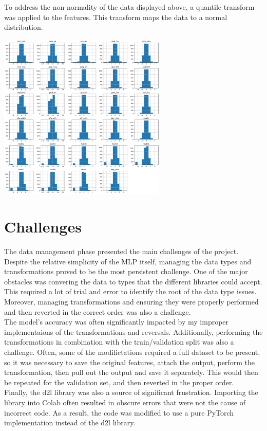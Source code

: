 \documentclass{article}[12pt]
\begin{document}
To address the non-normality of the data displayed above, a quantile transform was applied to the features. This transform maps the data to a normal distribution.\\

\begin{center}
    \includegraphics[width=0.6\textwidth]{histogram_after_quantile_with_labels.png}
\end{center}

\section*{Challenges}

The data management phase presented the main challenges of the project. Despite the relative simplicity of the MLP itself, managing the data types and transformations proved to be the most persistent challenge.
\indent
One of the major obstacles was convering the data to types that the different libraries could accept. This required a lot of trial and error to identify the root of the data type issues. Moreover, managing transformations and ensuring they were properly performed and then reverted in the correct order was also a challenge.\\
\indent
The model's accuracy was often significantly impacted by my improper implementaions of the transformations and reversals. Additionally, performing the transformations in combination with the train/validation split was also a challenge. Often, some of the modifictations required a full dataset to be present, so it was necessary to save the original features, attach the output, perform the transformation, then pull out the output and save it separately. This would then be repeated for the validation set, and then reverted in the proper order.\\
\indent
Finally, the d2l library was also a source of significant frustration. Importing the library into Colab often resulted in obscure errors that were not the cause of incorrect code. As a result, the code was modified to use a pure PyTorch implementation instead of the d2l library.\\
\end{document}
